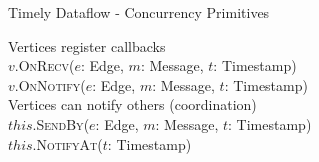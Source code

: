 \begin{frame}[t]{Timely Dataflow - Concurrency Primitives}

  \vspace{0.5cm}
  \begin{center}
  \end{center}

  \vspace{0.5cm}
  Vertices register callbacks \\
  \vspace{0.25cm}
  $v$.\textsc{OnRecv}($e$: Edge, $m$: Message, $t$: Timestamp) \\
  $v$.\textsc{OnNotify}($e$: Edge, $m$: Message, $t$: Timestamp) \\

  \vspace{0.75cm}
  Vertices can notify others (coordination) \\
  \vspace{0.25cm}
  $this$.\textsc{SendBy}($e$: Edge, $m$: Message, $t$: Timestamp) \\
  $this$.\textsc{NotifyAt}($t$: Timestamp) \\

\end{frame}

